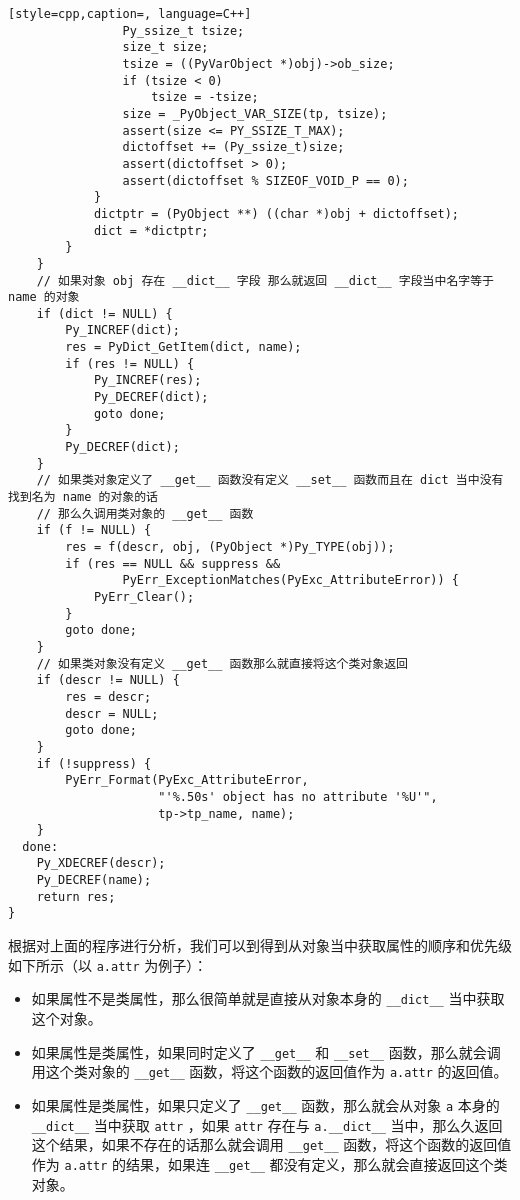 \begin{lstlisting}[style=cpp,caption=, language=C++]
                Py_ssize_t tsize;
                size_t size;
                tsize = ((PyVarObject *)obj)->ob_size;
                if (tsize < 0)
                    tsize = -tsize;
                size = _PyObject_VAR_SIZE(tp, tsize);
                assert(size <= PY_SSIZE_T_MAX);
                dictoffset += (Py_ssize_t)size;
                assert(dictoffset > 0);
                assert(dictoffset % SIZEOF_VOID_P == 0);
            }
            dictptr = (PyObject **) ((char *)obj + dictoffset);
            dict = *dictptr;
        }
    }
    // 如果对象 obj 存在 __dict__ 字段 那么就返回 __dict__ 字段当中名字等于 name 的对象
    if (dict != NULL) {
        Py_INCREF(dict);
        res = PyDict_GetItem(dict, name);
        if (res != NULL) {
            Py_INCREF(res);
            Py_DECREF(dict);
            goto done;
        }
        Py_DECREF(dict);
    }
    // 如果类对象定义了 __get__ 函数没有定义 __set__ 函数而且在 dict 当中没有找到名为 name 的对象的话
    // 那么久调用类对象的 __get__ 函数
    if (f != NULL) {
        res = f(descr, obj, (PyObject *)Py_TYPE(obj));
        if (res == NULL && suppress &&
                PyErr_ExceptionMatches(PyExc_AttributeError)) {
            PyErr_Clear();
        }
        goto done;
    }
    // 如果类对象没有定义 __get__ 函数那么就直接将这个类对象返回
    if (descr != NULL) {
        res = descr;
        descr = NULL;
        goto done;
    }
    if (!suppress) {
        PyErr_Format(PyExc_AttributeError,
                     "'%.50s' object has no attribute '%U'",
                     tp->tp_name, name);
    }
  done:
    Py_XDECREF(descr);
    Py_DECREF(name);
    return res;
}
\end{lstlisting}
根据对上面的程序进行分析，我们可以到得到从对象当中获取属性的顺序和优先级如下所示（以 \verb|a.attr| 为例子）：
\begin{itemize}
\item 如果属性不是类属性，那么很简单就是直接从对象本身的 \verb|__dict__| 当中获取这个对象。 
\item 如果属性是类属性，如果同时定义了 \verb|__get__| 和 \verb|__set__| 函数，那么就会调用这个类对象的 \verb|__get__| 函数，将这个函数的返回值作为 \verb|a.attr| 的返回值。 
\item 如果属性是类属性，如果只定义了 \verb|__get__| 函数，那么就会从对象 \verb|a| 本身的 \verb|__dict__| 当中获取 \verb|attr| ，如果 \verb|attr| 存在与 \verb|a.__dict__| 当中，那么久返回这个结果，如果不存在的话那么就会调用 \verb|__get__| 函数，将这个函数的返回值作为 \verb|a.attr| 的结果，如果连 \verb|__get__| 都没有定义，那么就会直接返回这个类对象。 
\end{itemize}
